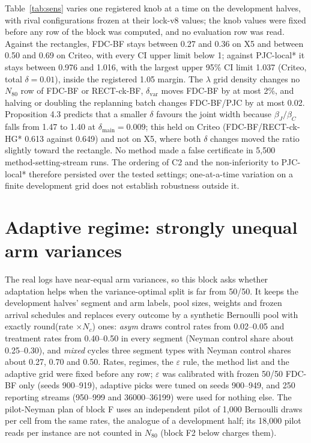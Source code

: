 \documentclass[sigconf,anonymous,review]{acmart}
\newcommand{\eps}{\varepsilon}
\newcommand{\dmain}{\delta_{\text{main}}}
\newcommand{\dvar}{\delta_{\text{var}}}
\begin{document}
Table~\ref{tab:sens} varies one registered knob at a time on the development halves, with rival configurations frozen at their lock-v8 values; the knob values were fixed before any row of the block was computed, and no evaluation row was read. Against the rectangles, FDC-BF stays between 0.27 and 0.36 on X5 and between 0.50 and 0.69 on Criteo, with every CI upper limit below 1; against PJC-local* it stays between 0.976 and 1.016, with the largest upper 95\% CI limit 1.037 (Criteo, total $\delta = 0.01$), inside the registered 1.05 margin. The $\lambda$ grid density changes no $N_{80}$ row of FDC-BF or RECT-ck-BF, $\dvar$ moves FDC-BF by at most 2\%, and halving or doubling the replanning batch changes FDC-BF/PJC by at most 0.02. Proposition 4.3 predicts that a smaller $\delta$ favours the joint width because $\beta_J/\beta_C$ falls from 1.47 to 1.40 at $\dmain = 0.009$; this held on Criteo (FDC-BF/RECT-ck-HG* 0.613 against 0.649) and not on X5, where both $\delta$ changes moved the ratio slightly toward the rectangle. No method made a false certificate in 5,500 method-setting-stream runs. The ordering of C2 and the non-inferiority to PJC-local* therefore persisted over the tested settings; one-at-a-time variation on a finite development grid does not establish robustness outside it.



\section{Adaptive regime: strongly unequal arm variances}\label{app:regime}

The real logs have near-equal arm variances, so this block asks whether adaptation helps when the variance-optimal split is far from 50/50. It keeps the development halves' segment and arm labels, pool sizes, weights and frozen arrival schedules and replaces every outcome by a synthetic Bernoulli pool with exactly round(rate $\times N_c$) ones: \emph{asym} draws control rates from 0.02--0.05 and treatment rates from 0.40--0.50 in every segment (Neyman control share about 0.25--0.30), and \emph{mixed} cycles three segment types with Neyman control shares about 0.27, 0.70 and 0.50. Rates, regimes, the $\eps$ rule, the method list and the adaptive grid were fixed before any row; $\eps$ was calibrated with frozen 50/50 FDC-BF only (seeds 900--919), adaptive picks were tuned on seeds 900--949, and 250 reporting streams (950--999 and 36000--36199) were used for nothing else. The pilot-Neyman plan of block F uses an independent pilot of 1,000 Bernoulli draws per cell from the same rates, the analogue of a development half; its 18,000 pilot reads per instance are not counted in $N_{80}$ (block F2 below charges them).
\end{document}
